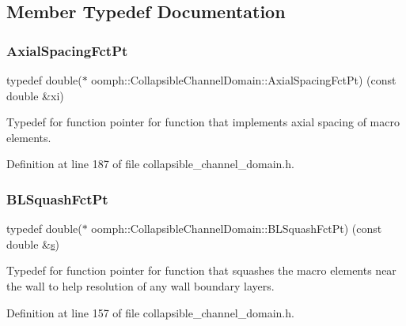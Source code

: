 \subsection{Member Typedef Documentation}
\mbox{\label{classoomph_1_1CollapsibleChannelDomain_a317472dab112beac771ecf6442a465f5}} 
\subsubsection{\texorpdfstring{Axial\+Spacing\+Fct\+Pt}{AxialSpacingFctPt}}
{\footnotesize\ttfamily typedef double($\ast$ oomph\+::\+Collapsible\+Channel\+Domain\+::\+Axial\+Spacing\+Fct\+Pt) (const double \&xi)}



Typedef for function pointer for function that implements axial spacing of macro elements. 



Definition at line 187 of file collapsible\+\_\+channel\+\_\+domain.\+h.

\mbox{\label{classoomph_1_1CollapsibleChannelDomain_a2bf1d7943bfac134a5c27a54c7e1faed}} 
\subsubsection{\texorpdfstring{B\+L\+Squash\+Fct\+Pt}{BLSquashFctPt}}
{\footnotesize\ttfamily typedef double($\ast$ oomph\+::\+Collapsible\+Channel\+Domain\+::\+B\+L\+Squash\+Fct\+Pt) (const double \&\hyperlink{cfortran_8h_ab7123126e4885ef647dd9c6e3807a21c}{s})}



Typedef for function pointer for function that squashes the macro elements near the wall to help resolution of any wall boundary layers. 



Definition at line 157 of file collapsible\+\_\+channel\+\_\+domain.\+h.



